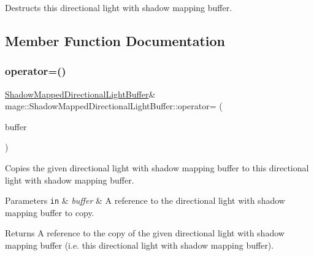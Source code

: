 Destructs this directional light with shadow mapping buffer. 

\subsection{Member Function Documentation}
\hypertarget{structmage_1_1_shadow_mapped_directional_light_buffer_a60019f1016a0390c13c2d1662854efd0}{}\label{structmage_1_1_shadow_mapped_directional_light_buffer_a60019f1016a0390c13c2d1662854efd0} 
\subsubsection{\texorpdfstring{operator=()}{operator=()}\hspace{0.1cm}{\footnotesize\ttfamily [1/2]}}
{\footnotesize\ttfamily \hyperlink{structmage_1_1_shadow_mapped_directional_light_buffer}{Shadow\+Mapped\+Directional\+Light\+Buffer}\& mage\+::\+Shadow\+Mapped\+Directional\+Light\+Buffer\+::operator= (\begin{DoxyParamCaption}\item[{const \hyperlink{structmage_1_1_shadow_mapped_directional_light_buffer}{Shadow\+Mapped\+Directional\+Light\+Buffer} \&}]{buffer }\end{DoxyParamCaption})\hspace{0.3cm}{\ttfamily [default]}}

Copies the given directional light with shadow mapping buffer to this directional light with shadow mapping buffer.


\begin{DoxyParams}[1]{Parameters}
\mbox{\tt in}  & {\em buffer} & A reference to the directional light with shadow mapping buffer to copy. \\
\hline
\end{DoxyParams}
\begin{DoxyReturn}{Returns}
A reference to the copy of the given directional light with shadow mapping buffer (i.\+e. this directional light with shadow mapping buffer). 
\end{DoxyReturn}
\hypertarget{structmage_1_1_shadow_mapped_directional_light_buffer_a901fd4d6b3c374a11b5a58c5061bd988}{}\label{structmage_1_1_shadow_mapped_directional_light_buffer_a901fd4d6b3c374a11b5a58c5061bd988} 
